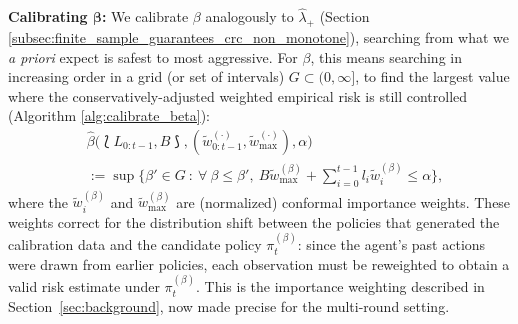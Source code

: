 \textbf{Calibrating $\boldsymbol{\beta}$:} We calibrate $\beta$ analogously to $\hat\lambda_+$ (Section \ref{subsec:finite_sample_guarantees_crc_non_monotone}), searching from what we \textit{a priori} expect is safest to most aggressive. For $\beta$, this means searching in increasing order in a grid (or set of intervals) $G\subset (0, \infty]$, to find the largest value where the conservatively-adjusted weighted empirical risk is still controlled (Algorithm \ref{alg:calibrate_beta}):
\begin{align}\label{eq:beta_hat_def_methods}
    &\hat{\beta}\big(\lbag L_{0:t-1}, B \rbag, (\tilde{w}_{0:t-1}^{(\cdot)}, \tilde{w}_{\max}^{(\cdot)}),  \alpha\big) \\
    & := \sup \Big\{\beta' \in G \ : \ \forall \ \beta \leq \beta', \ B\tilde{w}_{\max}^{(\beta)} + \sum_{i=0}^{t-1}l_i\tilde{w}_i^{(\beta)} \leq \alpha \Big\}, \nonumber
\end{align}
where the $\tilde{w}_i^{(\beta)}$ and $\tilde{w}_{\max}^{(\beta)}$ are (normalized) conformal importance weights. These weights correct for the distribution shift between the policies that generated the calibration data and the candidate policy $\pi_t^{(\beta)}$: since the agent's past actions were drawn from earlier policies, each observation must be reweighted to obtain a valid risk estimate under $\pi_t^{(\beta)}$. This is the importance weighting described in Section~\ref{sec:background}, now made precise for the multi-round setting.

